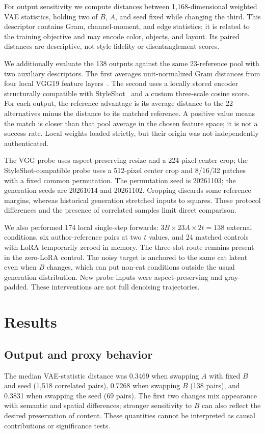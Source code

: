\documentclass[10pt,letterpaper]{article}
\begin{document}
For output sensitivity we compute distances between 1,168-dimensional weighted VAE statistics, holding two of $B$, $A$, and seed fixed while changing the third. This descriptor contains Gram, channel-moment, and edge statistics; it is related to the training objective and may encode color, objects, and layout. Its paired distances are descriptive, not style fidelity or disentanglement scores.

We additionally evaluate the 138 outputs against the same 23-reference pool with two auxiliary descriptors. The first averages unit-normalized Gram distances from four local VGG19 feature layers~\cite{vgg2014}. The second uses a locally stored encoder structurally compatible with StyleShot~\cite{styleshot2024} and a custom three-scale cosine score. For each output, the reference advantage is its average distance to the 22 alternatives minus the distance to its matched reference. A positive value means the match is closer than that pool average in the chosen feature space; it is not a success rate. Local weights loaded strictly, but their origin was not independently authenticated.

The VGG probe uses aspect-preserving resize and a 224-pixel center crop; the StyleShot-compatible probe uses a 512-pixel center crop and 8/16/32 patches with a fixed common permutation. The permutation seed is 20261103; the generation seeds are 20261014 and 20261102. Cropping discards some reference margins, whereas historical generation stretched inputs to squares. These protocol differences and the presence of correlated samples limit direct comparison.

We also performed 174 local single-step forwards: $3B\times23A\times2t=138$ external conditions, six author-reference pairs at two $t$ values, and 24 matched controls with LoRA temporarily zeroed in memory. The three-slot route remains present in the zero-LoRA control. The noisy target is anchored to the same cat latent even when $B$ changes, which can put non-cat conditions outside the usual generation distribution. New probe inputs were aspect-preserving and gray-padded. These interventions are not full denoising trajectories.



\section{Results}
\subsection{Output and proxy behavior}
The median VAE-statistic distance was 0.3469 when swapping $A$ with fixed $B$ and seed (1,518 correlated pairs), 0.7268 when swapping $B$ (138 pairs), and 0.3831 when swapping the seed (69 pairs). The first two changes mix appearance with semantic and spatial differences; stronger sensitivity to $B$ can also reflect the desired preservation of content. These quantities cannot be interpreted as causal contributions or significance tests.
\end{document}
